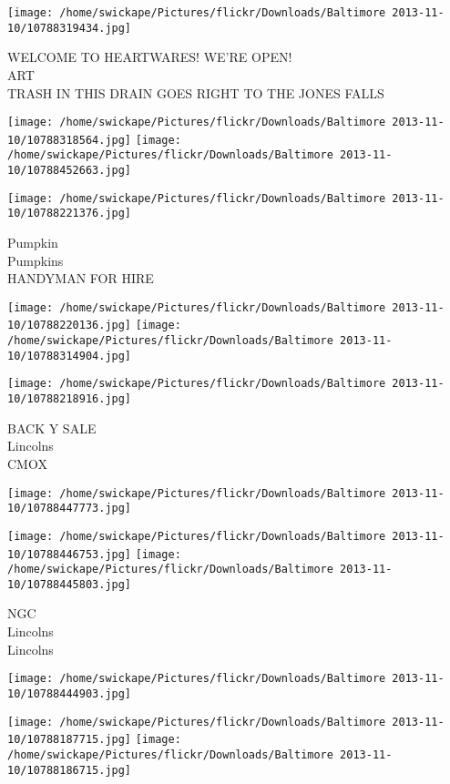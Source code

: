 \documentclass[10pt,letterpaper]{article}
\begin{document}
\vspace{0.25in}
\texttt{[image: /home/swickape/Pictures/flickr/Downloads/Baltimore 2013-11-10/10788319434.jpg]}

WELCOME TO HEARTWARES!  WE'RE OPEN!\\
ART\\
TRASH IN THIS DRAIN GOES RIGHT TO THE JONES FALLS
\pagebreak

\texttt{[image: /home/swickape/Pictures/flickr/Downloads/Baltimore 2013-11-10/10788318564.jpg]}
\texttt{[image: /home/swickape/Pictures/flickr/Downloads/Baltimore 2013-11-10/10788452663.jpg]}

\vspace{0.25in}
\texttt{[image: /home/swickape/Pictures/flickr/Downloads/Baltimore 2013-11-10/10788221376.jpg]}

Pumpkin\\
Pumpkins\\
HANDYMAN FOR HIRE
\pagebreak

\texttt{[image: /home/swickape/Pictures/flickr/Downloads/Baltimore 2013-11-10/10788220136.jpg]}
\texttt{[image: /home/swickape/Pictures/flickr/Downloads/Baltimore 2013-11-10/10788314904.jpg]}

\texttt{[image: /home/swickape/Pictures/flickr/Downloads/Baltimore 2013-11-10/10788218916.jpg]}

BACK Y SALE\\
Lincolns\\
CMOX
\pagebreak

\texttt{[image: /home/swickape/Pictures/flickr/Downloads/Baltimore 2013-11-10/10788447773.jpg]}

\vspace{0.25in}
\texttt{[image: /home/swickape/Pictures/flickr/Downloads/Baltimore 2013-11-10/10788446753.jpg]}
\texttt{[image: /home/swickape/Pictures/flickr/Downloads/Baltimore 2013-11-10/10788445803.jpg]}

NGC\\
Lincolns\\
Lincolns
\pagebreak

\texttt{[image: /home/swickape/Pictures/flickr/Downloads/Baltimore 2013-11-10/10788444903.jpg]}

\vspace{0.25in}
\texttt{[image: /home/swickape/Pictures/flickr/Downloads/Baltimore 2013-11-10/10788187715.jpg]}
\texttt{[image: /home/swickape/Pictures/flickr/Downloads/Baltimore 2013-11-10/10788186715.jpg]}
\end{document}
